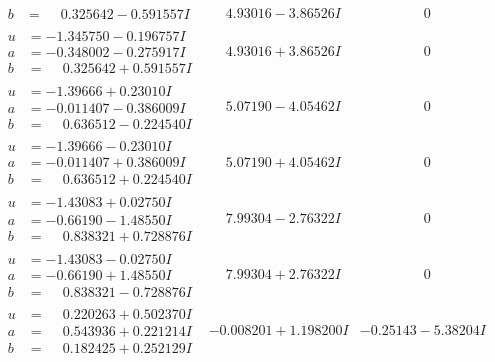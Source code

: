 \documentclass[1p]{elsarticle_modified}
\theoremstyle{definition}
\begin{document}
$$\begin{array}{c|c|c}
\begin{aligned}
b &= \phantom{-}0.325642 - 0.591557 I\end{aligned}
 & \phantom{-}4.93016 - 3.86526 I & \phantom{-0.000000 } 0 \\ \hline\begin{aligned}
u &= -1.345750 - 0.196757 I \\
a &= -0.348002 - 0.275917 I \\
b &= \phantom{-}0.325642 + 0.591557 I\end{aligned}
 & \phantom{-}4.93016 + 3.86526 I & \phantom{-0.000000 } 0 \\ \hline\begin{aligned}
u &= -1.39666 + 0.23010 I \\
a &= -0.011407 - 0.386009 I \\
b &= \phantom{-}0.636512 - 0.224540 I\end{aligned}
 & \phantom{-}5.07190 - 4.05462 I & \phantom{-0.000000 } 0 \\ \hline\begin{aligned}
u &= -1.39666 - 0.23010 I \\
a &= -0.011407 + 0.386009 I \\
b &= \phantom{-}0.636512 + 0.224540 I\end{aligned}
 & \phantom{-}5.07190 + 4.05462 I & \phantom{-0.000000 } 0 \\ \hline\begin{aligned}
u &= -1.43083 + 0.02750 I \\
a &= -0.66190 - 1.48550 I \\
b &= \phantom{-}0.838321 + 0.728876 I\end{aligned}
 & \phantom{-}7.99304 - 2.76322 I & \phantom{-0.000000 } 0 \\ \hline\begin{aligned}
u &= -1.43083 - 0.02750 I \\
a &= -0.66190 + 1.48550 I \\
b &= \phantom{-}0.838321 - 0.728876 I\end{aligned}
 & \phantom{-}7.99304 + 2.76322 I & \phantom{-0.000000 } 0 \\ \hline\begin{aligned}
u &= \phantom{-}0.220263 + 0.502370 I \\
a &= \phantom{-}0.543936 + 0.221214 I \\
b &= \phantom{-}0.182425 + 0.252129 I\end{aligned}
 & -0.008201 + 1.198200 I & -0.25143 - 5.38204 I \\ \hline\begin{aligned}

\end{aligned}
\end{array}$$
\end{document}
